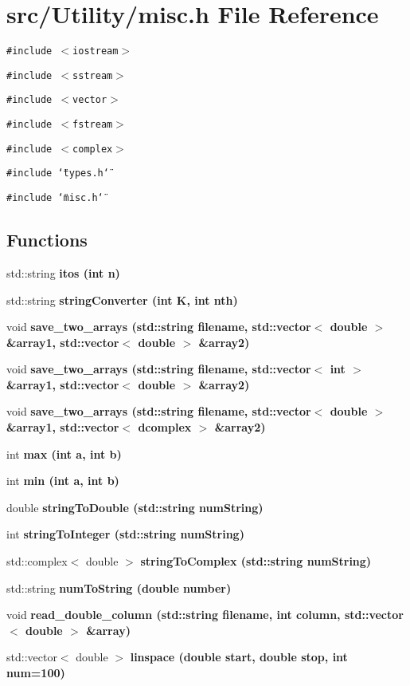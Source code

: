 \section{src/Utility/misc.h File Reference}
\label{misc_8h}
{\tt \#include $<$iostream$>$}\par
{\tt \#include $<$sstream$>$}\par
{\tt \#include $<$vector$>$}\par
{\tt \#include $<$fstream$>$}\par
{\tt \#include $<$complex$>$}\par
{\tt \#include \char`\"{}types.h\char`\"{}}\par
{\tt \#include \char`\"{}misc.h\char`\"{}}\par
\subsection*{Functions}
\begin{CompactItemize}
\item 
std::string \bf{itos} (int n)
\item 
std::string \bf{string\-Converter} (int K, int nth)
\item 
void \bf{save\_\-two\_\-arrays} (std::string filename, std::vector$<$ double $>$ \&array1, std::vector$<$ double $>$ \&array2)
\item 
void \bf{save\_\-two\_\-arrays} (std::string filename, std::vector$<$ int $>$ \&array1, std::vector$<$ double $>$ \&array2)
\item 
void \bf{save\_\-two\_\-arrays} (std::string filename, std::vector$<$ double $>$ \&array1, std::vector$<$ \bf{dcomplex} $>$ \&array2)
\item 
int \bf{max} (int a, int b)
\item 
int \bf{min} (int a, int b)
\item 
double \bf{string\-To\-Double} (std::string num\-String)
\item 
int \bf{string\-To\-Integer} (std::string num\-String)
\item 
std::complex$<$ double $>$ \bf{string\-To\-Complex} (std::string num\-String)
\item 
std::string \bf{num\-To\-String} (double number)
\item 
void \bf{read\_\-double\_\-column} (std::string filename, int column, std::vector$<$ double $>$ \&array)
\item 
std::vector$<$ double $>$ \bf{linspace} (double start, double stop, int num=100)
\end{CompactItemize}


